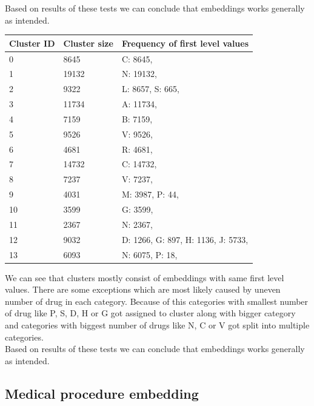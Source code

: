 Based on results of these tests we can conclude that embeddings works generally as intended.

\begin{table}[!h]
	\begin{tabular}{|p{}|p{}|p{}|}
		\hline
		Cluster ID & Cluster size & Frequency of first level values \\ \hline
		0 & 8645 & C: 8645, \\ \hline
		1 & 19132 & N: 19132, \\ \hline
		2 & 9322 & L: 8657, S: 665, \\ \hline
		3 & 11734 & A: 11734, \\ \hline
		4 & 7159 & B: 7159, \\ \hline
		5 & 9526 & V: 9526, \\ \hline
		6 & 4681 & R: 4681, \\ \hline
		7 & 14732 & C: 14732, \\ \hline
		8 & 7237 & V: 7237, \\ \hline
		9 & 4031 & M: 3987, P: 44, \\ \hline
		10 & 3599 & G: 3599, \\ \hline
		11 & 2367 & N: 2367, \\ \hline
		12 & 9032 & D: 1266, G: 897, H: 1136, J: 5733, \\ \hline
		13 & 6093 & N: 6075, P: 18, \\ \hline
\end{tabular}
\end{table}

We can see that clusters mostly consist of embeddings with same first level values. There are some exceptions which are most likely caused by uneven number of drug in each category. Because of this categories with smallest number of drug like P, S, D, H or G got assigned to cluster along with bigger category and categories with biggest number of drugs like N, C or V got split into multiple categories.  
\\

Based on results of these tests we can conclude that embeddings works generally as intended.

\subsection{Medical procedure embedding}

